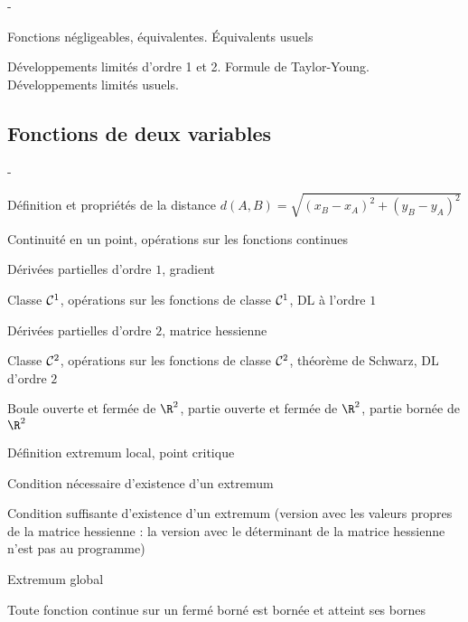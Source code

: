 \documentclass[11pt]{article}%
\begin{document}
\begin{noliste}{-}
 \item Fonctions négligeables, équivalentes. Équivalents usuels
 \item Développements limités d'ordre 1 et 2. Formule de Taylor-Young. 
 Développements limités usuels.
\end{noliste}



\subsection*{Fonctions de deux variables}

\begin{noliste}{-}
 \item Définition et propriétés de la distance 
 $d(A,B)=\sqrt{(x_B-x_A)^2+(y_B-y_A)^2}$
 \item Continuité en un point, opérations sur les fonctions continues
 \item Dérivées partielles d'ordre $1$, gradient
 \item Classe $\mathcal{C}^{1}$, opérations sur les fonctions de classe 
 $\mathcal{C}^{1}$, DL à l'ordre $1$
 \item Dérivées partielles d'ordre $2$, matrice hessienne
 \item Classe $\mathcal{C}^{2}$, opérations sur les fonctions de classe 
 $\mathcal{C}^{2}$, théorème de Schwarz, DL d'ordre $2$
 \item Boule ouverte et fermée de $\R^2$, partie ouverte et fermée de 
 $\R^2$, partie bornée de $\R^2$
 \item Définition extremum local, point critique
 \item Condition nécessaire d'existence d'un extremum
 \item Condition suffisante d'existence d'un extremum (version avec les 
 valeurs propres de la matrice hessienne : la version avec le déterminant 
 de la matrice hessienne n'est pas au programme)
 \item Extremum global
 \item Toute fonction continue sur un fermé borné est bornée et atteint 
 ses bornes
\end{noliste}
\end{document}
